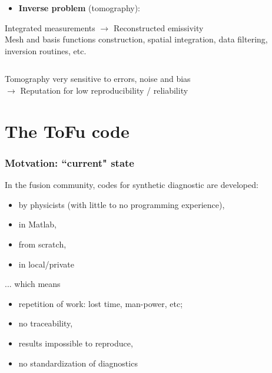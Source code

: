 \documentclass[10pt]{beamer}
\begin{document}
\begin{frame}
\begin{columns}
\begin{column}{0.675\textwidth}
\begin{center}
   	\begin{block}{}
	\begin{itemize}
	\item \textcolor{myblue}{\textbf{Inverse problem} (tomography):\\
	}
	\end{itemize}
	\end{block}
Integrated measurements $\longrightarrow$ Reconstructed emissivity \\
	 \alert{Mesh and basis functions construction, spatial integration, data filtering, inversion routines, etc.}
   	
   	\end{center}
	
   	\end{column}
%    	
\end{columns}

\pause
\vspace{-0.5cm}
\begin{block}{}
\begin{center}
Tomography very sensitive to errors, noise and bias\\
$\longrightarrow$  \alert{Reputation for low reproducibility / reliability }
\end{center}
	\end{block}
\end{frame}



\section{The ToFu code}


\begin{frame}
\frametitle{Motvation: ``current" state}

	In the fusion community, codes for synthetic diagnostic are developed:
	\begin{itemize}
		\item  by physicists (with little to no programming experience),
		\item  in Matlab,
		\item  from scratch,
		\item  in local/private 
	\end{itemize}

... which means
\begin{itemize}
		\item  repetition of work: lost time, man-power, etc;
		\item  no traceability,
		\item  results impossible to reproduce,
		\item  no standardization of diagnostics
	\end{itemize}
	
\end{frame}
\end{document}
